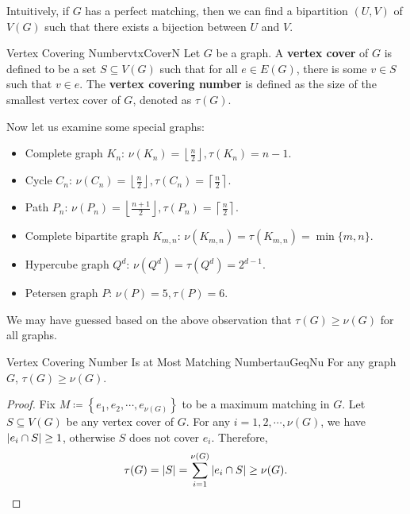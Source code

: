 \documentclass[math, code]{amznotes}
\theoremstyle{remark}
\begin{document}
Intuitively, if $G$ has a perfect matching, then we can find a bipartition $(U, V)$ of $V(G)$ such that there exists a bijection between $U$ and $V$.
\begin{dfnbox}{Vertex Covering Number}{vtxCoverN}
    Let $G$ be a graph. A {\color{red} \textbf{vertex cover}} of $G$ is defined to be a set $S \subseteq V(G)$ such that for all $e \in E(G)$, there is some $v \in S$ such that $v \in e$. The {\color{red} \textbf{vertex covering number}} is defined as the size of the smallest vertex cover of $G$, denoted as $\tau(G)$.
\end{dfnbox}
Now let us examine some special graphs:
\begin{itemize}
    \item Complete graph $K_n$: $\nu(K_n) = \left\lfloor\frac{n}{2}\right\rfloor, \tau(K_n) = n - 1$.
    \item Cycle $C_n$: $\nu(C_n) = \left\lfloor\frac{n}{2}\right\rfloor, \tau(C_n) = \left\lceil\frac{n}{2}\right\rceil$.
    \item Path $P_n$: $\nu(P_n) = \left\lfloor\frac{n + 1}{2}\right\rfloor, \tau(P_n) = \left\lceil\frac{n}{2}\right\rceil$.
    \item Complete bipartite graph $K_{m, n}$: $\nu(K_{m, n}) = \tau(K_{m, n}) = \min\{m, n\}$.
    \item Hypercube graph $Q^d$: $\nu(Q^d) = \tau(Q^d) = 2^{d - 1}$.
    \item Petersen graph $P$: $\nu(P) = 5, \tau(P) = 6$.
\end{itemize}
We may have guessed based on the above observation that $\tau(G) \geq \nu(G)$ for all graphs.
\begin{probox}{Vertex Covering Number Is at Most Matching Number}{tauGeqNu}
    For any graph $G$, $\tau(G) \geq \nu(G)$.
    \tcblower
    \begin{proof}
        Fix $M \coloneqq \left\{e_1, e_2, \cdots, e_{\nu(G)}\right\}$ to be a maximum matching in $G$. Let $S \subseteq V(G)$ be any vertex cover of $G$. For any $i = 1, 2, \cdots, \nu(G)$, we have ${\left\lvert {e_i \cap S} \right\rvert} \geq 1$, otherwise $S$ does not cover $e_i$. Therefore,
        \begin{equation*}
            \tau(G) = {\left\lvert {S} \right\rvert} = \sum_{i = 1}^{\nu(G)}{\left\lvert {e_i \cap S} \right\rvert} \geq \nu(G).
        \end{equation*}
    \end{proof}
\end{probox}
\end{document}
